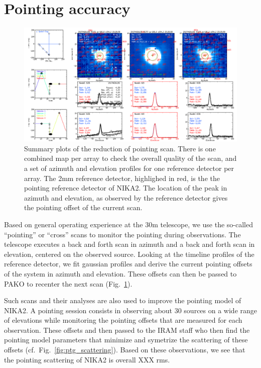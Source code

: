 \section{Pointing accuracy}
\label{se:pointing}

\begin{figure}
\begin{center}
\includegraphics[clip, angle=0, scale = 0.30]{Figures/plot_20170418s192.png}
\caption{Summary plots of the reduction of pointing scan. There is one combined
  map per array to check the overall quality of the scan, and a set of azimuth
  and elevation profiles for one reference detector per array. The 2mm reference
  detector, highlighed in red, is the the pointing reference detector of
  NIKA2. The location of the peak in azimuth and elevation, as observed by the
  reference detector gives the pointing offset of the current scan.}
\label{fig:ptg}
\end{center}
\end{figure}

Based on general operating experience at the 30m telescope, we use the so-called
``pointing'' or ``cross'' scans to monitor the pointing during observations. The
telescope executes a back and forth scan in azimuth and a back and forth scan in
elevation, centered on the observed source. Looking at the timeline profiles of
the reference detector, we fit gaussian profiles and derive the current pointing
offsets of the system in azimuth and elevation. These offsets can then be passed
to PAKO to recenter the next scan (Fig.~\ref{fig:ptg}).

Such scans and their analyses are also used to improve the pointing model
of NIKA2. A pointing session consists in observing about 30 sources on a wide
range of elevations while monitoring the pointing offsets that are measured for
each observation. These offsets and then passed to the IRAM staff who then find
the pointing model parameters that minimize and symetrize the scattering of
these offsets (cf.~Fig.~\ref{fig:ptg_scattering}). Based on these observations,
we see that the pointing scattering of NIKA2 is overall XXX rms.
